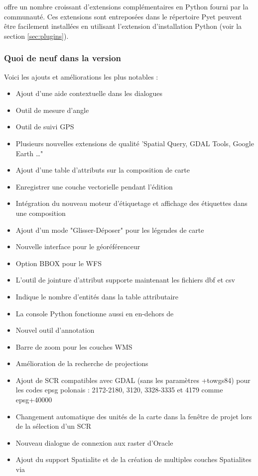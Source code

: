
\item \qg offre un nombre croissant d'extensions complémentaires en Python fourni par la communauté. Ces extensions sont entreposées dans le répertoire Py\qg et peuvent être facilement installées en utilisant l'extension d'installation Python (voir la section \ref{sec:plugins}).

\subsubsection{Quoi de neuf dans la version ~\CURRENT} 

Voici les ajouts et améliorations les plus notables :
\begin{itemize}[label=--]
 \item Ajout d'une aide contextuelle dans les dialogues
 \item Outil de mesure d'angle
 \item Outil de suivi GPS
 \item Plusieurs nouvelles extensions de qualité 'Spatial Query, GDAL Tools, Google Earth \dots"
 \item Ajout d'une table d'attributs sur la composition de carte
 \item Enregistrer une couche vectorielle pendant l'édition
 \item Intégration du nouveau moteur d'étiquetage et affichage des étiquettes dans une composition
 \item Ajout d'un mode "Glisser-Déposer" pour les légendes de carte
 \item Nouvelle interface pour le géoréférenceur
 \item Option BBOX pour le WFS 
 \item L'outil de jointure d'attribut supporte maintenant les fichiers dbf et csv
 \item Indique le nombre d'entités dans la table attributaire
 \item La console Python fonctionne aussi en en-dehors de \qg
 \item Nouvel outil d'annotation
 \item Barre de zoom pour les couches WMS
 \item Amélioration de la recherche de projections
 \item Ajout de SCR compatibles avec GDAL (sans les paramètres +towgs84) pour les codes epsg polonais : 2172-2180, 3120, 3328-3335 et 4179 comme epsg+40000
 \item Changement automatique des unités de la carte dans la fenêtre de projet lors de la sélection d'un SCR
 \item Nouveau dialogue de connexion aux raster d'Oracle
 \item Ajout du support Spatialite et de la création de multiples couches Spatialites via \qg
\end{itemize}
